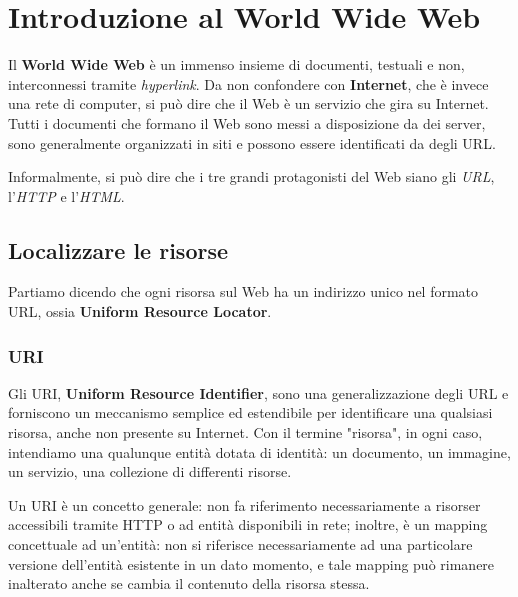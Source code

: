 \section{Introduzione al World Wide Web}

Il \textbf{World Wide Web} è un immenso insieme di documenti, testuali e non, interconnessi tramite \textit{hyperlink}. Da non confondere con \textbf{Internet}, che è invece una rete di computer, si può dire che il Web è un servizio che gira su Internet. Tutti i documenti che formano il Web sono messi a disposizione da dei server, sono generalmente organizzati in siti e possono essere identificati da degli URL.

\vspace{3mm}

Informalmente, si può dire che i tre grandi protagonisti del Web siano gli \textit{URL}, l'\textit{HTTP} e l'\textit{HTML}.


\subsection{Localizzare le risorse}

Partiamo dicendo che ogni risorsa sul Web ha un indirizzo unico nel formato URL, ossia \textbf{Uniform Resource Locator}.

\subsubsection{URI}

Gli URI, \textbf{Uniform Resource Identifier}, sono una generalizzazione degli URL e forniscono un meccanismo semplice ed estendibile per identificare una qualsiasi risorsa, anche non presente su Internet. Con il termine "risorsa", in ogni caso, intendiamo una qualunque entità dotata di identità: un documento, un immagine, un servizio, una collezione di differenti risorse.

\vspace{3mm}

Un URI è un concetto generale: non fa riferimento necessariamente a risorser accessibili tramite HTTP o ad entità disponibili in rete; inoltre, è un mapping concettuale ad un'entità: non si riferisce necessariamente ad una particolare versione dell'entità esistente in un dato momento, e tale mapping può rimanere inalterato anche se cambia il contenuto della risorsa stessa. 

\vspace{3mm}

